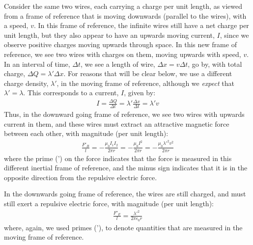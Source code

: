 Consider the same two wires, each carrying a charge per unit length, as viewed from a frame of reference that is moving downwards (parallel to the wires), with a speed, $v$. In this frame of reference, the infinite wires still have a net charge per unit length, but they also appear to have an upwards moving current, $I$, since we observe positive charges moving upwards through space.
In this new frame of reference, we see two wires with charges on them, moving upwards with speed, $v$. In an interval of time, $\Delta t$, we see a length of wire, $\Delta x=v\Delta t$, go by, with total charge, $\Delta Q=\lambda' \Delta x$. For reasons that will be clear below, we use a different charge density, $\lambda'$, in the moving frame of reference, although we \textit{expect} that $\lambda'=\lambda$. This corresponds to a current, $I$, given by:
\begin{align*}
I=\frac{\Delta Q}{\Delta t}=\lambda'\frac{\Delta x}{\Delta t}=\lambda' v
\end{align*} 
Thus, in the downward going frame of reference, we see two wires with upwards current in them, and these wires must extract an attractive magnetic force between each other, with magnitude (per unit length):
\begin{align*}
\frac{F'_B}{l} = -\frac{\mu_0 I_1I_2}{2\pi r}=-\frac{\mu_0 I^2}{2\pi r}=-\frac{\mu_0 \lambda'^2 v^2}{2\pi r}
\end{align*}
where the prime (') on the force indicates that the force is measured in this different inertial frame of reference, and the minus sign indicates that it is in the opposite direction from the repulsive electric force. 

In the downwards going frame of reference, the wires are still charged, and must still exert a repulsive electric force, with magnitude (per unit length):
\begin{align*}
\frac{F'_E}{l}=\frac{\lambda'^2}{2\pi \epsilon_0r}
\end{align*}
where, again, we used primes ('), to denote quantities that are measured in the moving frame of reference.

